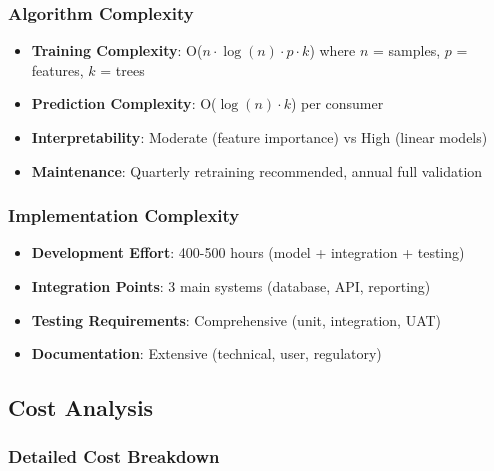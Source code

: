 \subsubsection{Algorithm Complexity}
\begin{itemize}
    \item \textbf{Training Complexity}: O($n \cdot \log(n) \cdot p \cdot k$) where $n$ = samples, $p$ = features, $k$ = trees
    \item \textbf{Prediction Complexity}: O($\log(n) \cdot k$) per consumer
    \item \textbf{Interpretability}: Moderate (feature importance) vs High (linear models)
    \item \textbf{Maintenance}: Quarterly retraining recommended, annual full validation
\end{itemize}

\subsubsection{Implementation Complexity}
\begin{itemize}
    \item \textbf{Development Effort}: 400-500 hours (model + integration + testing)
    \item \textbf{Integration Points}: 3 main systems (database, API, reporting)
    \item \textbf{Testing Requirements}: Comprehensive (unit, integration, UAT)
    \item \textbf{Documentation}: Extensive (technical, user, regulatory)
\end{itemize}

\subsection{Cost Analysis}

\subsubsection{Detailed Cost Breakdown}

